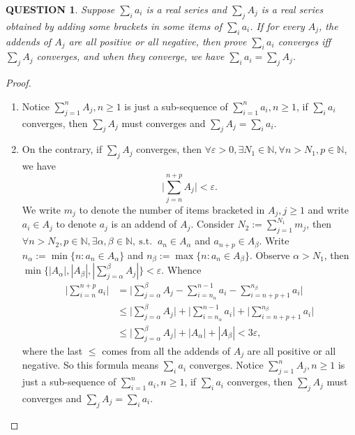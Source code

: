 \documentclass[12pt]{article}
\renewcommand{\(}{\left(}%
\renewcommand{\)}{\right)}%
\renewcommand{\[}{\left[}%
\renewcommand{\]}{\right]}%
\newcommand{\n}{\mathbb{N}}
\newcommand{\st}{\mathrm{\ s.t.\ }}
\newtheorem{question}{QUESTION}[section]}
\newtheorem{proof}{Proof.}}
\begin{document}
  \begin{question}
   Suppose $\sum_i a_i$ is a real series and $\sum_j A_j$ is a real series obtained by adding some brackets in some items of $\sum_i a_i$. If for every $A_j$, the addends of $A_j$ are all positive or all negative, then prove $\sum_i a_i$ converges iff $\sum_j A_j$ converges, and when they converge, we have $\sum_i a_i=\sum_j A_j$.
  \end{question}
  \begin{proof}
   \begin{enumerate}
    \item Notice $\sum_{j=1}^n A_j,n\geq 1$ is just a sub-sequence of $\sum_{i=1}^n a_i,n\geq 1$, if $\sum_i a_i$ converges, then $\sum_j A_j$ must converges and $\sum_j A_j=\sum_i a_i$.
    \item On the contrary, if $\sum_j A_j$ converges, then $\forall \varepsilon>0,\exists N_1\in\n,\forall n>N_1,p\in\n$, we have
    \begin{equation*}
     \bigg|\sum_{j=n}^{n+p}A_j\bigg|<\varepsilon.
    \end{equation*}
    We write $m_j$ to denote the number of items bracketed in $A_j,j\geq 1$ and write $a_i\in A_j$ to denote $a_j$ is an addend of $A_j$. Consider $N_2:=\sum_{j=1}^{N_1}m_j$,  then $\forall n>N_2,p\in\n,\exists \alpha,\beta \in\n,\st$ $a_n\in A_\alpha$ and $a_{n+p}\in A_\beta $. Write $n_\alpha :=\min\{n:a_n\in A_\alpha \}$ and $n_\beta:=\max\{n:a_n\in A_\beta\}$. Observe $\alpha>N_1$, then $\min\{|A_\alpha |,|A_\beta |,|\sum_{j=\alpha}^\beta A_j| \} <\varepsilon$. Whence
    \begin{equation*}
     \begin{split}
      \bigg|\sum_{i=n}^{n+p}a_i\bigg|&=\bigg|\sum_{j=\alpha}^\beta A_j-\sum_{i=n_\alpha}^{n-1}a_i-\sum_{i=n+p+1}^{n_\beta}a_i \bigg|\\
      &\leq \bigg|\sum_{j=\alpha}^\beta A_j\bigg|+\bigg|\sum_{i=n_\alpha}^{n-1}a_i\bigg|+\bigg|\sum_{i=n+p+1}^{n_\beta}a_i \bigg|\\
      &\leq \bigg|\sum_{j=\alpha}^\beta A_j\bigg|+ |A_\alpha|+|A_\beta|< 3\varepsilon,
     \end{split}
    \end{equation*}
    where the last $\leq $ comes from all the addends of $A_j$ are all positive or all negative. So this formula means $\sum_ia_i$ converges. Notice $\sum_{j=1}^n A_j,n\geq 1$ is just a sub-sequence of $\sum_{i=1}^n a_i,n\geq 1$, if $\sum_i a_i$ converges, then $\sum_j A_j$ must converges and $\sum_j A_j=\sum_i a_i$.
   \end{enumerate}
  \end{proof}
\end{document}
